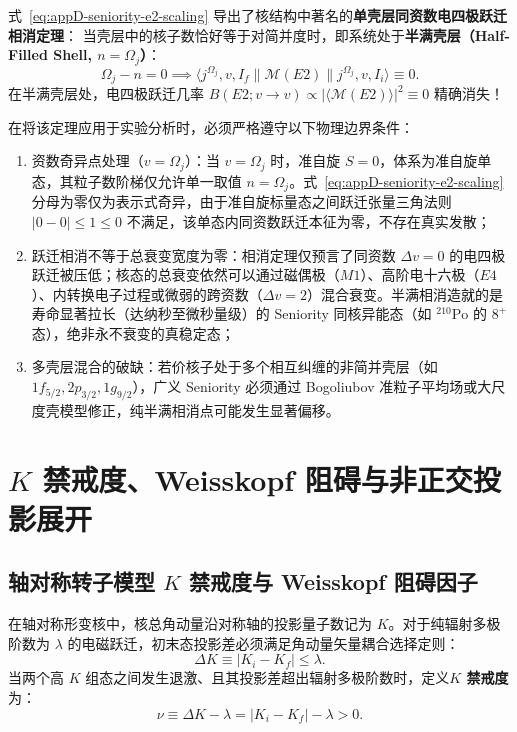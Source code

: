 式~\eqref{eq:appD-seniority-e2-scaling} 导出了核结构中著名的\textbf{单壳层同资数电四极跃迁相消定理}：
当壳层中的核子数恰好等于对简并度时，即系统处于\textbf{半满壳层（Half-Filled Shell, $n = \Omega_j$）}：
\begin{equation}\label{eq:appD-cancellation-theorem}
\Omega_j - n = 0 \implies \langle j^{\Omega_j}, v, I_f \| \mathcal{M}(E2) \| j^{\Omega_j}, v, I_i \rangle \equiv 0.
\end{equation}
在半满壳层处，电四极跃迁几率 $B(E2; v \to v) \propto |\langle \mathcal{M}(E2) \rangle|^2 \equiv 0$ 精确消失！

在将该定理应用于实验分析时，必须严格遵守以下物理边界条件：
\begin{enumerate}
\item 资数奇异点处理（$v = \Omega_j$）：当 $v = \Omega_j$ 时，准自旋 $S = 0$，体系为准自旋单态，其粒子数阶梯仅允许单一取值 $n = \Omega_j$。式~\eqref{eq:appD-seniority-e2-scaling} 分母为零仅为表示式奇异，由于准自旋标量态之间跃迁张量三角法则 $|0 - 0| \le 1 \le 0$ 不满足，该单态内同资数跃迁本征为零，不存在真实发散；
\item 跃迁相消不等于总衰变宽度为零：相消定理仅预言了同资数 $\Delta v = 0$ 的电四极跃迁被压低；核态的总衰变依然可以通过磁偶极（$M1$）、高阶电十六极（$E4$）、内转换电子过程或微弱的跨资数（$\Delta v = 2$）混合衰变。半满相消造就的是寿命显著拉长（达纳秒至微秒量级）的 Seniority 同核异能态（如 $^{210}\mathrm{Po}$ 的 $8^+$ 态），绝非永不衰变的真稳定态；
\item 多壳层混合的破缺：若价核子处于多个相互纠缠的非简并壳层（如 $1f_{5/2}, 2p_{3/2}, 1g_{9/2}$），广义 Seniority 必须通过 Bogoliubov 准粒子平均场或大尺度壳模型修正，纯半满相消点可能发生显著偏移。
\end{enumerate}

\section{$K$ 禁戒度、Weisskopf 阻碍与非正交投影展开}\label{sec:appD-k-forbidden}

\subsection{轴对称转子模型 $K$ 禁戒度与 Weisskopf 阻碍因子}

在轴对称形变核中，核总角动量沿对称轴的投影量子数记为 $K$。对于纯辐射多极阶数为 $\lambda$ 的电磁跃迁，初末态投影差必须满足角动量矢量耦合选择定则：
\begin{equation}\label{eq:appD-k-selection-rule}
\Delta K \equiv |K_i - K_f| \le \lambda.
\end{equation}
当两个高 $K$ 组态之间发生退激、且其投影差超出辐射多极阶数时，定义\textbf{$K$ 禁戒度}为：
\begin{equation}\label{eq:appD-k-forbiddenness-nu}
\nu \equiv \Delta K - \lambda = |K_i - K_f| - \lambda > 0.
\end{equation}

